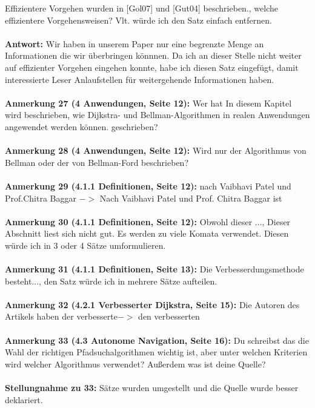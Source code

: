 \documentclass[a4paper,12pt]{book}
\begin{document}
\glqq Effizientere Vorgehen wurden in [Gol07] und [Gut04] beschrieben.\grqq, welche effizientere Vorgehensweisen? Vlt. würde ich den Satz einfach entfernen. 
\\ \\
\textbf{Antwort:}
Wir haben in unserem Paper nur eine begrenzte Menge an Informationen die wir überbringen könnnen. Da ich an dieser Stelle nicht weiter auf effizienter Vorgehen eingehen konnte, habe ich diesen Satz eingefügt, damit interessierte Leser Anlaufstellen für weitergehende Informationen haben.
\\ \\
\textbf{Anmerkung 27 (4 Anwendungen, Seite 12):}
Wer hat \glqq In diesem Kapitel wird beschrieben, wie Dijkstra- und Bellman-Algorithmen in realen Anwendungen angewendet werden können.\grqq{} geschrieben? 
\\ \\
\textbf{Anmerkung 28 (4 Anwendungen, Seite 12):}
Wird nur der Algorithmus von Bellman oder der von Bellman-Ford beschrieben?
\\ \\
\textbf{Anmerkung 29 (4.1.1 Definitionen, Seite 12):}
nach Vaibhavi Patel und Prof.Chitra Baggar $->$ Nach Vaibhavi Patel und Prof. Chitra Baggar ist
\\ \\
\textbf{Anmerkung 30 (4.1.1 Definitionen, Seite 12):}
\glqq Obwohl dieser ...\grqq, Dieser Abschnitt liest sich nicht gut. Es werden zu viele Komata verwendet. Diesen würde ich in 3 oder 4 Sätze umformulieren.  
\\ \\
\textbf{Anmerkung 31 (4.1.1 Definitionen, Seite 13):}
\glqq Die Verbesserdungsmethode besteht...\grqq, den Satz würde ich in mehrere Sätze aufteilen. 
\\ \\
\textbf{Anmerkung 32 (4.2.1 Verbesserter Dijkstra, Seite 15):}
\glqq Die Autoren des Artikels haben der verbesserte\grqq $->$ den verbesserten
\\ \\
\textbf{Anmerkung 33 (4.3 Autonome Navigation, Seite 16):}
Du schreibst das die Wahl der richtigen Pfadsuchalgorithmen wichtig ist, aber unter welchen Kriterien wird welcher Algorithmus verwendet? 
Außerdem was ist deine Quelle?
\\ \\
\textbf{Stellungnahme zu 33:}
Sätze wurden umgestellt und die Quelle wurde besser deklariert.
\\ \\
\end{document}
